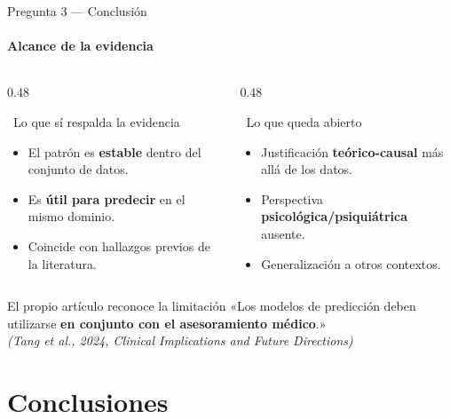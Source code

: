\documentclass[aspectratio=169,11pt]{beamer}
\begin{document}
\begin{frame}{Pregunta 3 — Conclusión}
  \framesubtitle{Alcance de la evidencia}
  \begin{columns}[T]
    \begin{column}{0.48\textwidth}
      \begin{exampleblock}{\faCheckCircle\  Lo que sí respalda la evidencia}
        \small
        \begin{itemize}
          \item El patrón es \textbf{estable} dentro del conjunto de datos.
          \item Es \textbf{útil para predecir} en el mismo dominio.
          \item Coincide con hallazgos previos de la literatura.
        \end{itemize}
      \end{exampleblock}
    \end{column}
    \begin{column}{0.48\textwidth}
      \begin{alertblock}{\faExclamationTriangle\ Lo que queda abierto}
        \small
        \begin{itemize}
          \item Justificación \textbf{teórico-causal} más allá de los datos.
          \item Perspectiva \textbf{psicológica/psiquiátrica} ausente.
          \item Generalización a otros contextos.
        \end{itemize}
      \end{alertblock}
    \end{column}
  \end{columns}
  \vspace{0.2em}
  \begin{block}{El propio artículo reconoce la limitación}
    \centering\small
    «Los modelos de predicción deben utilizarse \textbf{en conjunto con el
    asesoramiento médico}.»\\
    \textit{(Tang et al., 2024, Clinical Implications and Future Directions)}
  \end{block}
\end{frame}


\section{Conclusiones}
\end{document}
